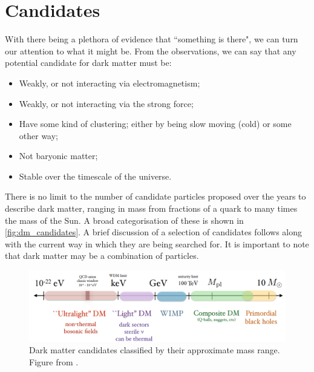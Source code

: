 \section{Candidates}
\par
With there being a plethora of evidence that ``something is there", we can turn our attention to what it might be.
From the observations, we can say that any potential candidate for dark matter must be:
\begin{itemize}
    \item Weakly, or not interacting via electromagnetism;
    \item Weakly, or not interacting via the strong force;
    \item Have some kind of clustering; either by being slow moving (cold) or some other way;
    \item Not baryonic matter;
    \item Stable over the timescale of the universe.
\end{itemize}
There is no limit to the number of candidate particles proposed over the years to describe dark matter, ranging in mass from fractions of a quark to many times the mass of the Sun.
A broad categorisation of these is shown in \autoref{fig:dm_candidates}.
A brief discussion of a selection of candidates follows along with the current way in which they are being searched for.
It is important to note that dark matter may be a combination of particles.
\begin{figure}
    \centering
    \includegraphics[width=15cm]{Figures/DarkMatterEvidence/dark_matter_candidates.png}
    \caption{Dark matter candidates classified by their approximate mass range. Figure from \cite{dm_figure_candidates_ref}.}
    \label{fig:dm_candidates}
\end{figure}

